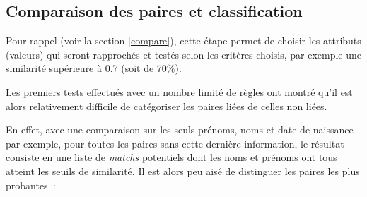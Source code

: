 \documentclass[a4paper,12pt,twoside]{book}
\begin{document}
            \subsection{Comparaison des paires et classification}
	            
	            Pour rappel (voir la section \ref{compare}), cette étape permet de choisir les attributs (valeurs) qui seront rapprochés et testés selon les critères choisis, par exemple une similarité supérieure à 0.7 (soit de 70\%).
	            
	            Les premiers tests effectués avec un nombre limité de règles ont montré qu'il est alors relativement difficile de catégoriser les paires liées de celles non liées.
	            \pagebreak
	            
	            En effet, avec une comparaison sur les seuls prénoms, noms et date de naissance par exemple, pour toutes les paires sans cette dernière information, le résultat consiste en une liste de \textit{matchs} potentiels dont les noms et prénoms ont tous atteint les seuils de similarité. Il est alors peu aisé de distinguer les paires les plus probantes~:
\end{document}

